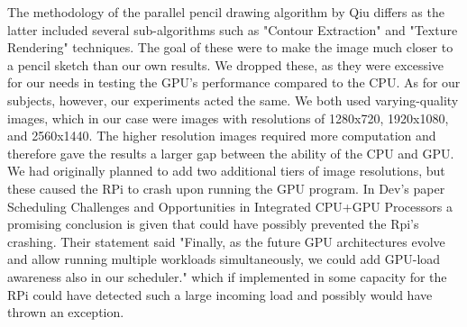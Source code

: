 \documentclass[conference]{IEEEtran}
\begin{document}
The methodology of the parallel pencil drawing algorithm by Qiu differs as the latter included several sub-algorithms such as "Contour Extraction" and "Texture Rendering" techniques\cite{Liu}. The goal of these were to make the image much closer to a pencil sketch than our own results. We dropped these, as they were excessive for our needs in testing the GPU's performance compared to the CPU. As for our subjects, however, our experiments acted the same. We both used varying-quality images, which in our case were images with resolutions of 1280x720, 1920x1080, and 2560x1440. The higher resolution images required more computation and therefore gave the results a larger gap between the ability of the CPU and GPU. We had originally planned to add two additional tiers of image resolutions, but these caused the RPi to crash upon running the GPU program. In Dev's paper Scheduling Challenges and Opportunities in Integrated CPU+GPU Processors a promising conclusion is given that could have possibly prevented the Rpi's crashing. Their statement said "Finally, as the future GPU architectures evolve and allow running multiple workloads simultaneously, we could add GPU-load awareness also in our scheduler." which if implemented in some capacity for the RPi could have detected such a large incoming load and possibly would have thrown an exception\cite{Dev}.
\end{document}
